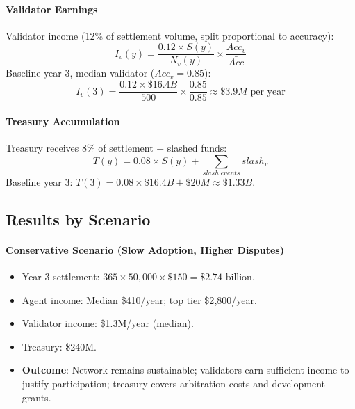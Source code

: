 \documentclass[11pt]{article}
\begin{document}
\paragraph{Validator Earnings} Validator income (12\% of settlement volume, split proportional to accuracy):
\begin{equation}
I_v(y) = \frac{0.12 \times S(y)}{N_v(y)} \times \frac{Acc_v}{\bar{Acc}}
\end{equation}
Baseline year 3, median validator ($Acc_v = 0.85$):
\begin{equation}
I_v(3) = \frac{0.12 \times \$16.4B}{500} \times \frac{0.85}{0.85} \approx \$3.9M \text{ per year}
\end{equation}

\paragraph{Treasury Accumulation} Treasury receives 8\% of settlement + slashed funds:
\begin{equation}
T(y) = 0.08 \times S(y) + \sum_{slash \; events} slash_v
\end{equation}
Baseline year 3: $T(3) = 0.08 \times \$16.4B + \$20M \approx \$1.33B$.

\subsection{Results by Scenario}
\paragraph{Conservative Scenario (Slow Adoption, Higher Disputes)}
\begin{itemize}[noitemsep]
  \item Year 3 settlement: $365 \times 50{,}000 \times \$150 = \$2.74$ billion.
  \item Agent income: Median \$410/year; top tier \$2{,}800/year.
  \item Validator income: \$1.3M/year (median).
  \item Treasury: \$240M.
  \item \textbf{Outcome}: Network remains sustainable; validators earn sufficient income to justify participation; treasury covers arbitration costs and development grants.
\end{itemize}
\end{document}
